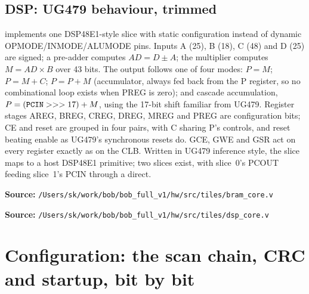 \documentclass[11pt,a4paper]{article}
\newcommand{\code}[1]{\texttt{\detokenize{#1}}}
\newcommand{\src}[1]{\par\smallskip\noindent\textbf{Source: }\nolinkurl{/Users/sk/work/bob/bob_full_v1/#1}\par\smallskip}
\begin{document}
\subsection{DSP: UG479 behaviour, trimmed}
\code{dsp_core.v} implements one DSP48E1-style slice with static configuration
instead of dynamic OPMODE/INMODE/ALUMODE pins. Inputs A (25), B (18), C (48) and
D (25) are signed; a pre-adder computes $AD = D \pm A$; the multiplier computes
$M = AD\times B$ over 43 bits. The output follows one of four modes:
$P=M$; $P=M+C$; $P=P+M$ (accumulator, always fed back from the P register, so
no combinational loop exists when PREG is zero); and cascade accumulation,
$P=(\code{PCIN} >>> 17)+M$, using the 17-bit shift familiar from UG479.
Register stages AREG, BREG, CREG, DREG, MREG and PREG are configuration bits;
CE and reset are grouped in four pairs, with C sharing P's controls, and reset
beating enable as UG479's synchronous resets do. GCE, GWE and GSR act on every
register exactly as on the CLB. Written in UG479 inference style, the slice maps
to a host DSP48E1 primitive; two slices exist, with slice~0's PCOUT feeding
slice~1's PCIN through a direct.
\src{hw/src/tiles/bram_core.v}
\src{hw/src/tiles/dsp_core.v}

\section{Configuration: the scan chain, CRC and startup, bit by bit}
\label{sec:config}
\end{document}

